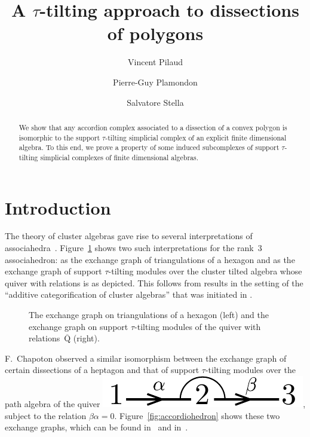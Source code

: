 \documentclass{amsart}
\title{A $\tau$-tilting approach to dissections of polygons}
\author{Vincent Pilaud}
\author{Pierre-Guy Plamondon}
\author{Salvatore Stella}
\theoremstyle{definition}
\newcommand{\fref}[1]{Figure~\ref{#1}} %
\newcommand{\quiver}{\mathrm{Q}} %
\begin{document}
\begin{abstract}
We show that any accordion complex associated to a dissection of a convex polygon is isomorphic to the support $\tau$-tilting simplicial complex of an explicit finite dimensional algebra.
To this end, we prove a property of some induced subcomplexes of support $\tau$-tilting simplicial complexes of finite dimensional algebras.
\end{abstract}

\vspace*{-1cm}
\maketitle{}
\vspace*{-.5cm}


\section{Introduction}

The theory of cluster algebras gave rise to several interpretations of associahedra~\cite{Tamari, Stasheff}.
\fref{fig:associahedron} shows two such interpretations for the rank~$3$ associahedron: as the exchange graph of triangulations of a hexagon and as the exchange graph of support $\tau$-tilting modules over the cluster tilted algebra whose quiver with relations is as depicted. 
This follows from results in the setting of the ``additive categorification of cluster algebras'' that was initiated in \cite{CalderoChapotonSchiffler, BuanMarshReinekeReitenTodorov}.

\begin{figure}
	\capstart
	\centerline{\associahedronAccordionTikz{}\associahedronSiltingTikz{}}
	\caption{The exchange graph on triangulations of a hexagon (left) and the exchange graph on support $\tau$-tilting modules of the quiver with relations~$\overline{\quiver}$ (right).}
	\label{fig:associahedron}
\end{figure}

F.~Chapoton observed a similar isomorphism between the exchange graph of certain dissections of a heptagon and that of support $\tau$-tilting modules over the path algebra of the quiver \includegraphics[scale=.35]{relation}, subject to the relation $\beta\alpha = 0$. \fref{fig:accordiohedron} shows these two exchange graphs, which can be found in~\cite[Fig.~7]{Chapoton-quadrangulations} and in~\cite[Exm.~6.4]{AdachiIyamaReiten}.
\end{document}
